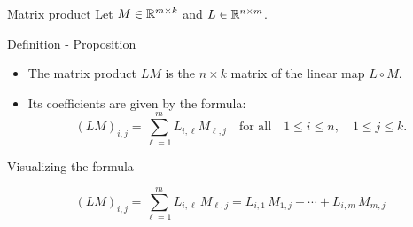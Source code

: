 \documentclass{beamer}
\begin{document}
\begin{frame}[t]{Matrix product}
	Let $M \in \mathbb{R}^{m \times k}$ and $L \in \mathbb{R}^{n \times m}$. 
	\vspace{1.5cm}
	\begin{block}{Definition - Proposition}
		\begin{itemize}
			\item The matrix product $LM$ is the $n \times k$ matrix of the linear map $L \circ M$.
				\vspace{0.1cm}
			\item Its coefficients are given by the formula:
		\vspace{-0.2cm}
				$$
				(LM)_{i,j} = \sum_{\ell=1}^m L_{i,\ell} M_{\ell,j} \quad \text{for all} \quad 1 \leq i \leq n, \quad 1 \leq j \leq k.
				$$
		\end{itemize}
		\vspace{-0.4cm}
	\end{block}
\end{frame}
\begin{frame}[t]{Visualizing the formula}
	\vspace{-0.9cm}
	\begin{exampleblock}{}
		\vspace{-0.4cm}
		$$
		(LM)_{i,j} = \sum_{\ell=1}^m L_{i,\ell} \, M_{\ell,j} 
		= L_{i,1} \, M_{1,j} + \cdots + L_{i,m} \, M_{m,j} 
		$$
		\vspace{-0.3cm}
	\end{exampleblock}
\end{frame}
\end{document}
